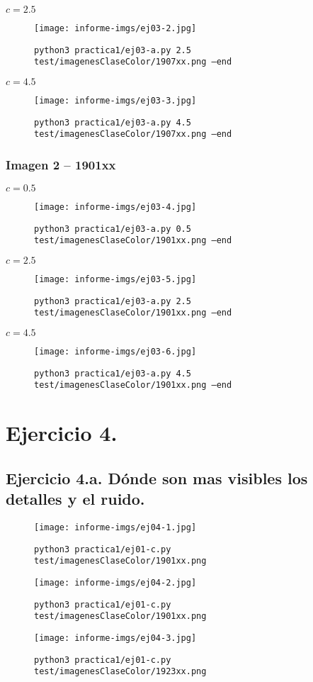 \documentclass[11pt, spanish]{article}
\begin{document}
$c = 2.5$
\begin{figure}[H]
\centering
  \texttt{[image: informe-imgs/ej03-2.jpg]}
  \caption{\texttt{python3 practica1/ej03-a.py 2.5 test/imagenesClaseColor/1907xx.png --end}}
\end{figure}

$c = 4.5$
\begin{figure}[H]
\centering
  \texttt{[image: informe-imgs/ej03-3.jpg]}
  \caption{\texttt{python3 practica1/ej03-a.py 4.5 test/imagenesClaseColor/1907xx.png --end}}
\end{figure}

\subsubsection*{Imagen 2 -- 1901xx}
$c = 0.5$
\begin{figure}[H]
\centering
  \texttt{[image: informe-imgs/ej03-4.jpg]}
  \caption{\texttt{python3 practica1/ej03-a.py 0.5 test/imagenesClaseColor/1901xx.png --end}}
\end{figure}

$c = 2.5$
\begin{figure}[H]
\centering
  \texttt{[image: informe-imgs/ej03-5.jpg]}
  \caption{\texttt{python3 practica1/ej03-a.py 2.5 test/imagenesClaseColor/1901xx.png --end}}
\end{figure}

$c = 4.5$
\begin{figure}[H]
\centering
  \texttt{[image: informe-imgs/ej03-6.jpg]}
  \caption{\texttt{python3 practica1/ej03-a.py 4.5 test/imagenesClaseColor/1901xx.png --end}}
\end{figure}

\newpage

\section{Ejercicio 4.}

\subsection{Ejercicio 4.a. Dónde son mas visibles los detalles y el ruido.}
\begin{figure}[H]
\centering
  \texttt{[image: informe-imgs/ej04-1.jpg]}
  \caption{\texttt{python3 practica1/ej01-c.py test/imagenesClaseColor/1901xx.png}}
\end{figure}
\begin{figure}[H]
\centering
  \texttt{[image: informe-imgs/ej04-2.jpg]}
  \caption{\texttt{python3 practica1/ej01-c.py test/imagenesClaseColor/1901xx.png}}
\end{figure}
\begin{figure}[H]
\centering
  \texttt{[image: informe-imgs/ej04-3.jpg]}
  \caption{\texttt{python3 practica1/ej01-c.py test/imagenesClaseColor/1923xx.png}}
\end{figure}
\end{document}
